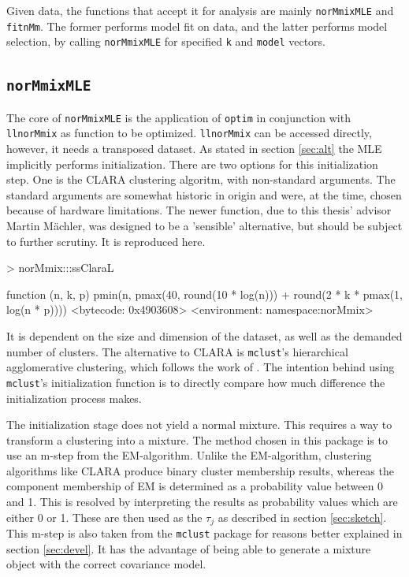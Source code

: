 Given data, the functions that accept it for analysis are mainly 
{\tt norMmixMLE} and {\tt fitnMm}. The former performs model fit on data, and 
the latter performs model selection, by calling {\tt norMmixMLE} for specified
{\tt k} and {\tt model} vectors. 

\subsection{{\tt norMmixMLE}}

The core of {\tt norMmixMLE} is the application of {\tt optim} in conjunction
with {\tt llnorMmix} as function to be optimized. {\tt llnorMmix} can be 
accessed directly, however, it needs a transposed dataset.
As stated in section \ref{sec:alt} the MLE implicitly performs initialization.
There are two options for this initialization step. One is the CLARA clustering
algoritm, with non-standard arguments. The standard arguments are somewhat 
historic in origin and were, at the time, chosen because of hardware 
limitations. The newer function, due to this thesis' advisor Martin M\"achler, 
was designed to be a 'sensible' alternative, but should be subject to further 
scrutiny. It is reproduced here.

\begin{Schunk}
\begin{Sinput}
>     norMmix:::ssClaraL
\end{Sinput}
\begin{Soutput}
function (n, k, p) 
pmin(n, pmax(40, round(10 * log(n))) + round(2 * k * pmax(1, 
    log(n * p))))
<bytecode: 0x4903608>
<environment: namespace:norMmix>
\end{Soutput}
\end{Schunk}

It is dependent on the size and dimension of the dataset, as well as the 
demanded number of clusters.
The alternative to CLARA is {\tt mclust}'s hierarchical agglomerative 
clustering, which follows the work of \cite{Fra98}. The intention behind using 
{\tt mclust}'s initialization function is to directly compare how much 
difference the initialization process makes.

The initialization stage does not yield a normal mixture. This requires a way
to transform a clustering into a mixture. The method chosen in this package is
to use an m-step from the EM-algorithm. Unlike the EM-algorithm, clustering 
algorithms like CLARA produce binary cluster membership results, whereas the 
component membership of EM is determined as a probability value between 0 and 1.
This is resolved by interpreting the results as probability values which are 
either 0 or 1. These are then used as the $\tau_j$ as described in section 
\ref{sec:sketch}. This m-step is also taken from the {\tt mclust} package for 
reasons better explained in section \ref{sec:devel}.
It has the advantage of being able to generate a mixture object with the 
correct covariance model.

